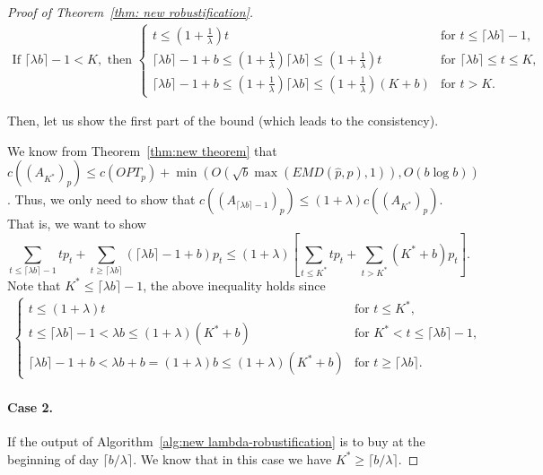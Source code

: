 \begin{proof}[Proof of Theorem~\ref{thm: new robustification}]
    
    \begin{align*}
    \text{If } \lceil \lambda b \rceil - 1 < K, \text{ then } 
    \begin{cases}
        t \leq (1+\frac{1}{\lambda})t & \text{for } t \leq \lceil \lambda b \rceil - 1, \\
        \lceil \lambda b \rceil - 1 + b \leq (1+\frac{1}{\lambda}) \lceil \lambda b \rceil \leq (1+\frac{1}{\lambda}) t & \text{for } \lceil \lambda b \rceil \leq t \leq K, \\
        \lceil \lambda b \rceil - 1 + b \leq (1+\frac{1}{\lambda}) \lceil \lambda b \rceil \leq  (1+\frac{1}{\lambda})(K+b) & \text{for } t >K.
    \end{cases}
    \end{align*}

    Then, let us show the first part of the bound (which leads to the consistency). 

    We know from Theorem~\ref{thm:new theorem} that $c((A_{K^*})_p) \leq c(OPT_p) + \min \left(O(\sqrt{b} \max(EMD(\hat{p},p),1)), O(b \log b)\right)$. Thus,  we only need to show that $c((A_{\lceil \lambda b \rceil - 1})_{p}) \leq (1+\lambda)c((A_{K^*})_p)$. That is, we want to show
    \[\sum _{t \leq \lceil \lambda b \rceil - 1} tp_t + \sum_{t \geq \lceil \lambda b \rceil} (\lceil \lambda b \rceil - 1 + b)p_t \leq (1+\lambda)\left[ \sum_{t \leq K^*}tp_t + \sum_{t>K^*}(K^*+b)p_t \right].\]
    Note that $K^* \leq \lceil \lambda b \rceil - 1$, the above inequality holds since
    \begin{align*} 
    \begin{cases}
        t \leq (1+\lambda)t & \text{for } t \leq K^*, \\
        t \leq  \lceil \lambda b \rceil - 1< \lambda b  \leq (1+\lambda)(K^*+b) & \text{for } K^*<t \leq \lceil \lambda b \rceil - 1, \\
        \lceil \lambda b \rceil - 1 +b < \lambda b +b=(1+\lambda)b \leq (1+\lambda)(K^*+b) & \text{for } t \geq \lceil \lambda b \rceil.
    \end{cases}
    \end{align*}

    \paragraph{Case 2.} If the output of Algorithm~\ref{alg:new lambda-robustification} is to buy at the beginning of day $\lceil b/\lambda \rceil$. We know that in this case we have $K^* \geq \lceil b/\lambda \rceil$. 


\end{proof}
